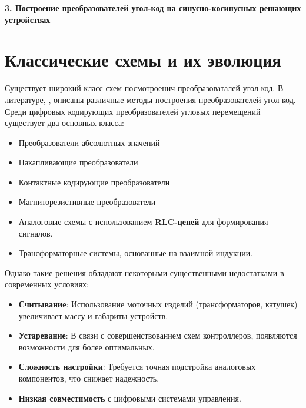 \newpage
\begin{center}
  \textbf{\large 3. Построение преобразователей угол-код на синусно-косинусных решающих устройствах}
\end{center}


\section{Классические схемы и их эволюция}

Существует широкий класс схем посмотроенич преобразоваталей угол-код.
В литературе, \cite{Vulvet}, описаны различные методы построения преобразователей угол-код. 
Среди цифровых кодирующих преобразователей угловых перемещений существует два основных класса: 
\begin{itemize}
  \item Преобразователи абсолютных значений
  \item Накапливающие преобразователи 
\end{itemize}

\begin{itemize}
  \item Контактные кодирующие преобразователи 
  \item Магниторезистивные преобразователи
  \item Аналоговые схемы с использованием \textbf{RLC-цепей} для формирования сигналов.
  \item Трансформаторные системы, основанные на взаимной индукции.
\end{itemize}

Однако такие решения обладают некоторыми существенными недостатками в современных условиях:
\begin{itemize}
  \item \textbf{Считывание}: Использование моточных изделий (трансформаторов, катушек) увеличивает массу и габариты устройств.
  \item \textbf{Устаревание}: В связи с совершенствованием схем контроллеров, появляются возможности для более оптимальных.
  \item \textbf{Сложность настройки}: Требуется точная подстройка аналоговых компонентов, что снижает надежность.
  \item \textbf{Низкая совместимость} с цифровыми системами управления.
\end{itemize}

